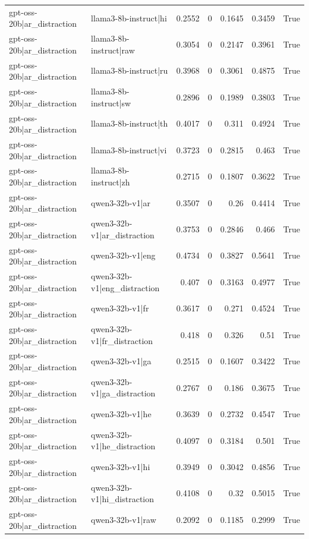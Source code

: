 \begin{table}
\begin{tabular}{l l r r r r l}
gpt-oss-20b|ar_distraction & llama3-8b-instruct|hi & 0.2552 & 0 & 0.1645 & 0.3459 & True \\
gpt-oss-20b|ar_distraction & llama3-8b-instruct|raw & 0.3054 & 0 & 0.2147 & 0.3961 & True \\
gpt-oss-20b|ar_distraction & llama3-8b-instruct|ru & 0.3968 & 0 & 0.3061 & 0.4875 & True \\
gpt-oss-20b|ar_distraction & llama3-8b-instruct|sw & 0.2896 & 0 & 0.1989 & 0.3803 & True \\
gpt-oss-20b|ar_distraction & llama3-8b-instruct|th & 0.4017 & 0 & 0.311 & 0.4924 & True \\
gpt-oss-20b|ar_distraction & llama3-8b-instruct|vi & 0.3723 & 0 & 0.2815 & 0.463 & True \\
gpt-oss-20b|ar_distraction & llama3-8b-instruct|zh & 0.2715 & 0 & 0.1807 & 0.3622 & True \\
gpt-oss-20b|ar_distraction & qwen3-32b-v1|ar & 0.3507 & 0 & 0.26 & 0.4414 & True \\
gpt-oss-20b|ar_distraction & qwen3-32b-v1|ar_distraction & 0.3753 & 0 & 0.2846 & 0.466 & True \\
gpt-oss-20b|ar_distraction & qwen3-32b-v1|eng & 0.4734 & 0 & 0.3827 & 0.5641 & True \\
gpt-oss-20b|ar_distraction & qwen3-32b-v1|eng_distraction & 0.407 & 0 & 0.3163 & 0.4977 & True \\
gpt-oss-20b|ar_distraction & qwen3-32b-v1|fr & 0.3617 & 0 & 0.271 & 0.4524 & True \\
gpt-oss-20b|ar_distraction & qwen3-32b-v1|fr_distraction & 0.418 & 0 & 0.326 & 0.51 & True \\
gpt-oss-20b|ar_distraction & qwen3-32b-v1|ga & 0.2515 & 0 & 0.1607 & 0.3422 & True \\
gpt-oss-20b|ar_distraction & qwen3-32b-v1|ga_distraction & 0.2767 & 0 & 0.186 & 0.3675 & True \\
gpt-oss-20b|ar_distraction & qwen3-32b-v1|he & 0.3639 & 0 & 0.2732 & 0.4547 & True \\
gpt-oss-20b|ar_distraction & qwen3-32b-v1|he_distraction & 0.4097 & 0 & 0.3184 & 0.501 & True \\
gpt-oss-20b|ar_distraction & qwen3-32b-v1|hi & 0.3949 & 0 & 0.3042 & 0.4856 & True \\
gpt-oss-20b|ar_distraction & qwen3-32b-v1|hi_distraction & 0.4108 & 0 & 0.32 & 0.5015 & True \\
gpt-oss-20b|ar_distraction & qwen3-32b-v1|raw & 0.2092 & 0 & 0.1185 & 0.2999 & True \\

\end{tabular}
\end{table}
